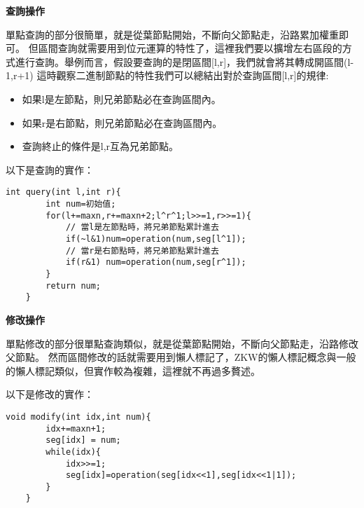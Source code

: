     \textbf{查詢操作}

    單點查詢的部分很簡單，就是從葉節點開始，不斷向父節點走，沿路累加權重即可。
    但區間查詢就需要用到位元運算的特性了，這裡我們要以擴增左右區段的方式進行查詢。舉例而言，假設要查詢的是閉區間[l,r]，我們就會將其轉成開區間(l-1,r+1)
    這時觀察二進制節點的特性我們可以總結出對於查詢區間[l,r]的規律:
    \begin{itemize}
        \item 如果l是左節點，則兄弟節點必在查詢區間內。
        \item 如果r是右節點，則兄弟節點必在查詢區間內。
        \item 查詢終止的條件是l,r互為兄弟節點。
    \end{itemize}

    以下是查詢的實作：
    \begin{lstlisting}[caption=ZKW區間查詢]
    int query(int l,int r){
        int num=初始值;
        for(l+=maxn,r+=maxn+2;l^r^1;l>>=1,r>>=1){
            // 當l是左節點時，將兄弟節點累計進去
            if(~l&1)num=operation(num,seg[l^1]);
            // 當r是右節點時，將兄弟節點累計進去
            if(r&1) num=operation(num,seg[r^1]);
        }
        return num;
    }
    \end{lstlisting}

    \textbf{修改操作}

    單點修改的部分很單點查詢類似，就是從葉節點開始，不斷向父節點走，沿路修改父節點。
    然而區間修改的話就需要用到懶人標記了，ZKW的懶人標記概念與一般的懶人標記類似，但實作較為複雜，這裡就不再過多贅述。

    以下是修改的實作：
    \begin{lstlisting}[caption=ZKW區間查詢]
    void modify(int idx,int num){
        idx+=maxn+1;
        seg[idx] = num;
        while(idx){
            idx>>=1;
            seg[idx]=operation(seg[idx<<1],seg[idx<<1|1]);
        }
    }
    \end{lstlisting}

   